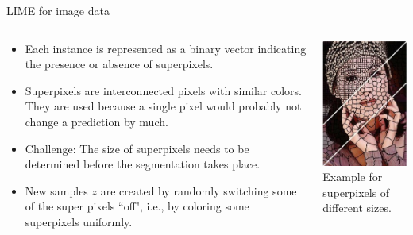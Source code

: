 \documentclass[aspectratio=169]{../latex_main/tntbeamer}  %
\begin{document}
\begin{frame}[c]{LIME for image data }
	\begin{columns}
		\begin{column}{0.67\textwidth}
			\begin{itemize}
				\item Each instance is represented as a binary vector indicating the presence or absence of superpixels. 
				\item Superpixels are interconnected pixels with similar colors. They are used because a single pixel would probably not change a prediction by much.
				\item Challenge: The size of superpixels needs to be determined before the segmentation takes place.
				\item New samples $z$ are created by randomly switching some of the super pixels ``off", i.e., by coloring some superpixels uniformly.  
			\end{itemize}		
		\end{column}
		\begin{column}{0.26\textwidth}  
		
			\begin{center}
				\includegraphics[width=.7\textwidth]{figure/superpixel_woman}\\
				 Example for superpixels of different sizes.
			\end{center}
			
		\end{column}
	\end{columns}
\end{frame}
\end{document}
